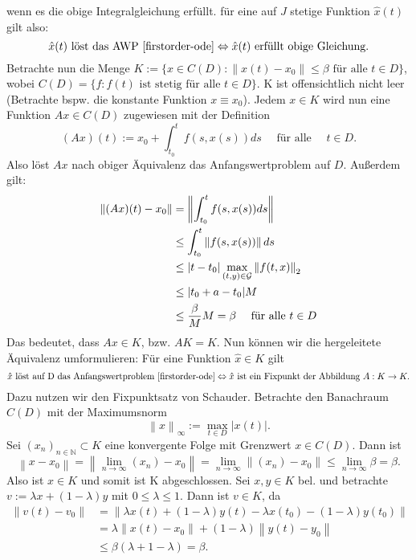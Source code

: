 wenn es die obige Integralgleichung erfüllt.
für eine auf $J$ stetige Funktion $\hat{x}(t)$ gilt also:
\[
    \hat{x}(t) \text{ löst das AWP \eqref{firstorder-ode}}  \Leftrightarrow \hat{x}(t) \text{ erfüllt obige Gleichung.}
\]
Betrachte nun die Menge $K := \{ x \in C(D): \left\lVert x(t) - x_0 \right\rVert \leq \beta \text{ für alle } t \in D \}$,
wobei $C(D)=\{f: f(t) \text{ ist stetig für alle } t \in D \}$. K ist offensichtlich nicht leer (Betrachte bspw. die
konstante Funktion $x \equiv x_0$). Jedem $x \in K$ wird nun eine Funktion $Ax \in C(D)$ zugewiesen mit der Definition
\[
    (Ax)(t) := x_0 + \int_{t_0}^{t} f(s, x(s)) ds \quad \text{ für alle } \quad t \in D.
\]
Also löst $Ax$ nach obiger Äquivalenz das Anfangswertproblem auf $D$. Außerdem gilt:
\begin{align*}
    \left\lVert (Ax)(t) - x_0 \right\rVert &= \left\lVert \int_{t_0}^{t} f(s, x(s)) ds \right\rVert \\
    &\leq \int_{t_0}^{t} \left\lVert f(s, x(s)) \right\rVert ds \\
    &\leq |t - t_0| \max_{(t,y)\in {\cal G}}\left\lVert f(t,x)\right\rVert_{2} \\
    &\leq |t_0 + a - t_0| M \\
    &\leq \frac{\beta}{M}M = \beta \quad \text{ für alle } t \in D
\end{align*}
Das bedeutet, dass $Ax \in K$, bzw. $AK = K$. Nun können wir die hergeleitete Äquivalenz umformulieren:
Für eine Funktion $\hat{x} \in K$ gilt
\[
    \hat{x} \text{ löst auf D das Anfangswertproblem } \eqref{firstorder-ode} \Leftrightarrow \hat{x}
    \text{ ist ein Fixpunkt der Abbildung } A:K \rightarrow K.
\]
Dazu nutzen wir den Fixpunktsatz von Schauder. Betrachte den Banachraum $C(D)$ mit der Maximumsnorm
\[
    \left\lVert x \right\rVert_{\infty}:=\max_{t \in D} |x(t)|.
\]
Sei $(x_n)_{n \in \mathbb{N}} \subset K$ eine konvergente Folge mit Grenzwert $x \in C(D)$. Dann ist
\[
    \left\lVert x - x_0 \right\rVert = \left\lVert \lim_{n \rightarrow \infty}(x_n) - x_0 \right\rVert
    = \lim_{n \rightarrow \infty} \left\lVert (x_n) - x_0 \right\rVert \leq \lim_{n \rightarrow \infty} \beta = \beta.
\]
Also ist $x \in K$ und somit ist K abgeschlossen. Sei $x,y \in K $ bel. und betrachte $v:=\lambda x + (1-\lambda)y$
mit $0 \leq \lambda \leq 1$. Dann ist $v \in K$, da
\begin{align*}
    \left\lVert v(t) - v_0 \right\rVert
    &= \left\lVert \lambda x(t) + (1-\lambda)y(t) - \lambda x(t_0) - (1-\lambda)y(t_0) \right\rVert \\
    &= \lambda \left\lVert x(t) - x_0 \right\rVert + (1 - \lambda) \left\lVert y(t) - y_0 \right\rVert \\
    &\leq \beta (\lambda + 1 - \lambda) = \beta.
\end{align*}
